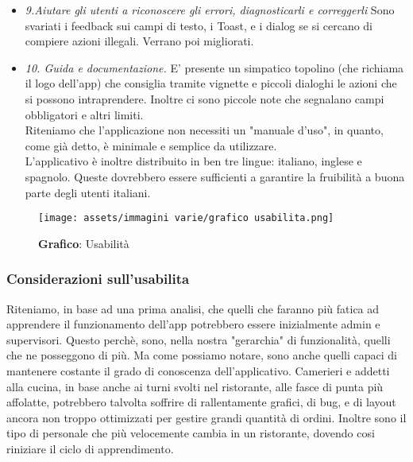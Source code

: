 \begin{flushleft}
\begin{itemize}
            \item \emph{9.Aiutare gli utenti a riconoscere gli errori, diagnosticarli e correggerli} Sono svariati i feedback sui campi di testo, i Toast, e i dialog se si cercano di compiere azioni illegali. Verrano poi migliorati.
            \item  \emph{10. Guida e documentazione.} E' presente un simpatico topolino (che richiama il logo dell'app) che consiglia tramite vignette e piccoli dialoghi le azioni che si possono intraprendere. Inoltre ci sono piccole note che segnalano campi obbligatori e altri limiti.\\
            Riteniamo che l'applicazione non necessiti un "manuale d'uso", in quanto, come già detto, è minimale e semplice da utilizzare.\\
            L'applicativo è inoltre distribuito in ben tre lingue: italiano, inglese e spagnolo. Queste dovrebbero essere sufficienti a garantire la fruibilità a buona parte degli utenti italiani.
            
        \end{itemize}
    \end{flushleft}

    \begin{figure}[H]
        \centering
        \texttt{[image: assets/immagini varie/grafico usabilita.png]}
        \caption{\textbf{Grafico}: Usabilità}\label{fig:Usabilità_graph}
    \end{figure}
    \vspace{0.5cm}
    \subsubsection*{Considerazioni sull'usabilita}
        \begin{flushleft}
            Riteniamo, in base ad una prima analisi, che quelli che faranno più fatica ad apprendere il funzionamento dell'app potrebbero essere inizialmente admin e supervisori.
            Questo perchè, sono, nella nostra "gerarchia" di funzionalità, quelli che ne posseggono di più. 
            Ma come possiamo notare, sono anche quelli capaci di mantenere costante il grado di conoscenza dell'applicativo.
            Camerieri e addetti alla cucina, in base anche ai turni svolti nel ristorante, alle fasce di punta più affolatte, potrebbero talvolta
            soffrire di rallentamente grafici, di bug, e di layout ancora non troppo ottimizzati per gestire grandi quantità di ordini.
            Inoltre sono il tipo di personale che più velocemente cambia in un ristorante, dovendo cosi riniziare il ciclo di apprendimento.
        \end{flushleft}